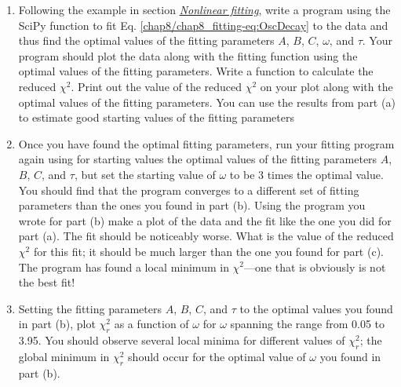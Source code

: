 \documentclass[letterpaper,10pt,english]{sphinxmanual}
\begin{document}
\begin{enumerate}
\begin{enumerate}
\item {} 
Following the example in section {\hyperref[chap8/chap8_fitting:sec-nonlinfit]{\emph{Nonlinear fitting}}}, write a program using the SciPy function  to fit Eq. \eqref{chap8/chap8_fitting-eq:OscDecay} to the data and thus find the optimal values of the fitting parameters \(A\), \(B\), \(C\), \(\omega\), and \(\tau\).  Your program should plot the data along with the fitting function using the optimal values of the fitting parameters.  Write a function to calculate the reduced \(\chi^2\).  Print out the value of the reduced \(\chi^2\) on your plot along with the optimal values of the fitting parameters.  You can use the results from part (a) to estimate good starting values of the fitting parameters

\item {} 
Once you have found the optimal fitting parameters, run your fitting program again using for starting values the optimal values of the fitting parameters \(A\), \(B\), \(C\), and \(\tau\), but set the starting value of \(\omega\) to be 3 times the optimal value.  You should find that the program converges to a different set of fitting parameters than the ones you found in part (b).  Using the program you wrote for part (b) make a plot of the data and the fit like the one you did for part (a).  The fit should be noticeably worse.  What is the value of the reduced \(\chi^2\) for this fit; it should be much larger than the one you found for part (c).  The program  has found a local minimum in \(\chi^2\)---one that is obviously is not the best fit!

\item {} 
Setting the fitting parameters \(A\), \(B\), \(C\), and \(\tau\) to the optimal values you found in part (b), plot \(\chi_r^2\) as a function of \(\omega\) for \(\omega\) spanning the range from 0.05 to 3.95.  You should observe several local minima for different values of \(\chi_r^2\); the global minimum in \(\chi_r^2\) should occur for the optimal value of \(\omega\) you found in part (b).


\end{enumerate}
\end{enumerate}
\end{document}
